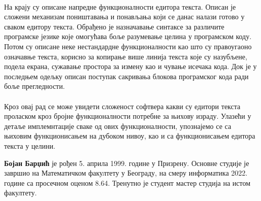 \documentclass[12pt,oneside]{memoir}
\begin{document}
\paragraph{}
На крају су описане напредне функционалности едитора текста. Описан
је сложени механизам поништавања и понављања који се данас налази готово
у сваком едитору текста. Обрађено је назначавање синтаксе за различите
програмске језике које омогућава боље разумевање целина у програмском
коду. Потом су описане неке нестандардне функционалности као што су
правоугаоно означавње текста, корисно за копирање више линија текста које су назубљене, подела екрана, сужавање простора за измену као и
чување исечака кода. Док је у последњем одељку описан поступак сакривања
блокова програмског кода ради боље прегледности.

\paragraph{}
Кроз овај рад се може увидети сложеност софтвера какви су едитори текста
проласком кроз бројне функционалности потребне за њихову израду. Улазећи у детаље имплемнтације сваке од ових функционалности, упознајемо се са њиховим функционисањем на дубоком нивоу, као и са функционисањем едитора текста у целини.
\literatura

\backmatter

\begin{biografija}
\textbf{Бојан Барџић} је рођен 5. априла 1999. године у Призрену. Основне студије
је завршио на Математичком факултету у Београду, на смеру информатика 2022. године
са просечном оценом 8.64. Тренутно је студент мастер студија на истом факултету.
\end{biografija}
\end{document}
